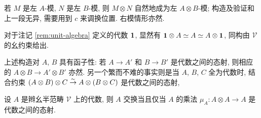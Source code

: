 若 $M$ 是左 $A$-模, $N$ 是左 $B$-模, 则 $M \otimes N$ 自然地成为左 $A \otimes B$-模; 构造及验证和上一段无异, 需要用到 $c$ 来调换位置. 右模情形亦然.

对于注记 \ref{rem:unit-algebra} 定义的代数 $\bm{1}$, 显然有 $\bm{1} \otimes A \simeq A \simeq A \otimes \bm{1}$, 同构由 $\mathcal{V}$ 的幺约束给出.

\begin{remark}\label{rem:Alg-otimes-functorial}
	上述构造对 $A$, $B$ 具有函子性: 若 $A \to A'$ 和 $B \to B'$ 是代数之间的态射, 则相应的 $A \otimes B \to A' \otimes B'$ 亦然. 另一个繁而不难的事实则是当 $A$, $B$, $C$ 全为代数时, 结合约束 $(A \otimes B) \otimes C \stackrel{\sim}{\rightarrow} A \otimes (B \otimes C)$ 是代数之间的态射,
\end{remark}

\begin{lemma}\label{prop:CAlg-mu}
	设 $A$ 是辫幺半范畴 $\mathcal{V}$ 上的代数, 则 $A$ 交换当且仅当 $A$ 的乘法 $\mu_A: A \otimes A \to A$ 是代数之间的态射.
\end{lemma}
